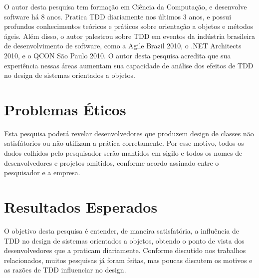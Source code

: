 O autor desta pesquisa tem formação em Ciência da Computação, e desenvolve software há 8
anos. Pratica TDD diariamente nos últimos 3 anos, e possui profundos
conhecimentos teóricos e práticos sobre orientação a objetos e métodos ágeis.
Além disso, o autor palestrou sobre TDD em eventos da indústria brasileira
de desenvolvimento de software, como a Agile Brazil 2010, o .NET Architects
2010, e o QCON São Paulo 2010. O autor desta pesquisa acredita que sua experiência nessas
áreas aumentam sua capacidade de análise dos efeitos de TDD no design de sistemas 
orientados a objetos.

\section{Problemas Éticos}
\label{sec:planejamento-etica}

Esta pesquisa poderá revelar desenvolvedores que produzem design de classes não
satisfátorios ou não utilizam a prática corretamente.
Por esse motivo, todos os dados colhidos pelo pesquisador serão mantidos em
sigilo e todos os nomes de desenvolvedores e projetos omitidos, conforme acordo 
assinado entre o pesquisador e a empresa.

\section{Resultados Esperados}
\label{sec:planejamento-resultados-esperados}

O objetivo desta pesquisa é entender, de maneira satisfatória, a influência de 
TDD no design de sistemas orientados a objetos, obtendo o ponto de vista dos 
desenvolvedores que a praticam diariamente. Conforme discutido nos trabalhos 
relacionados, muitos pesquisas já foram feitas, mas poucas discutem os motivos 
e as razões de TDD influenciar no design.
